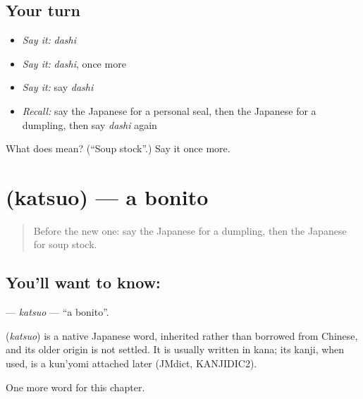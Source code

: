 \subsection*{Your turn}
\begin{itemize}
\raggedright
  \item \emph{Say it:} \emph{dashi}
  \item \emph{Say it:} \emph{dashi}, once more
  \item \emph{Say it:} say \emph{dashi}
  \item \emph{Recall:} say the Japanese for a personal seal, then the Japanese for a dumpling, then say \emph{dashi} again
\end{itemize}

\begin{tcolorbox}[breakable,colback=teal!4,colframe=teal!35!black,title={Before you move on}]
What does  mean? (\textquotedblleft{}Soup stock\textquotedblright{}.) Say it once more.
\end{tcolorbox}
\section[\texorpdfstring{\ja{かつお} (katsuo)}{かつお (katsuo)}]{ (katsuo) — a bonito}

\label{lesson:JA-C113-katsuo}



\begin{quote}
Before the new one: say the Japanese for a dumpling, then the Japanese for soup stock.
\end{quote}

\subsection*{You'll want to know: }
\textbf{} — \emph{katsuo} — \textquotedblleft{}a bonito\textquotedblright{}.

\begin{cousinweb}
\textbf{} (\emph{katsuo}) is a native Japanese word, inherited rather than borrowed from Chinese, and its older origin is not settled. It is usually written in kana; its kanji, when used, is a kun'yomi attached later (JMdict, KANJIDIC2).
\end{cousinweb}

\begin{grammarlens}[title={What you've built}]
One more word for this chapter.
\end{grammarlens}

